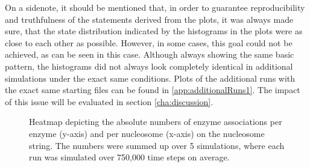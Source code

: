         On a sidenote, it should be mentioned that, in order to guarantee reproducibility and truthfulness of the statements derived from the plots, it was always made sure, that the state distribution indicated by the histograms in the plots were as close to each other as possible. However, in some cases, this goal could not be achieved, as can be seen in this case. Although always showing the same basic pattern, the histograms did not always look completely identical in additional simulations under the exact same conditions. Plots of the additional runs with the exact same starting files can be found in \ref{app:additionalRuns1}. The impact of this issue will be evaluated in section \ref{cha:discussion}.\\

        \begin{figure}[htpb!]
            \centering
            \caption{Heatmap depicting the absolute numbers of enzyme associations per enzyme (y-axis) and per nucleosome (x-axis) on the nucleosome string. The numbers were summed up over 5 simulations, where each run was simulated over 750,000 time steps on average.}
            \label{img:nonCoopAssocHeatmap}
        \end{figure}


